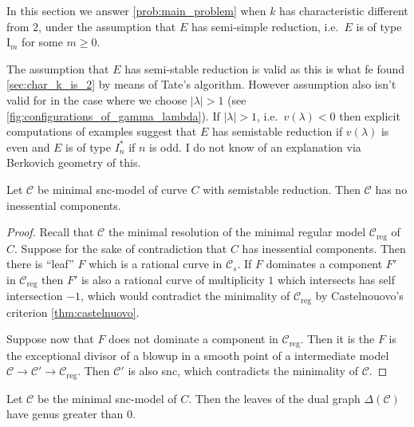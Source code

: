 In this section we answer \cref{prob:main_problem} when $k$ has characteristic different from $2$, under the assumption that $E$ has semi-simple reduction, i.e.\  $E$ is of type $\mathrm I_m$ for some $m \ge 0$. 

\begin{remark}
	The assumption that $E$ has semi-stable reduction is valid as this is what fe found \cref{sec:char_k_is_2} by means of Tate's algorithm. 
	However assumption also isn't valid for in the case where we choose $|\lambda| > 1$ (see \cref{fig:configurations_of_gamma_lambda}).
	If $|\lambda| > 1$, i.e.\ $v(\lambda) < 0$ then
	explicit computations of examples suggest that  $E$ has semistable reduction if $v(\lambda)$ is even and $E$ is of type $I^*_n$ if $n$ is odd. 
	I do not know of an explanation via Berkovich geometry of this. 
\end{remark}

\begin{lemma}\label{lem:semistable_skeleton}
	Let $\mathscr C$ be minimal snc-model of curve $C$ with semistable reduction.
	Then $\mathscr C$ has no inessential components. 
\end{lemma}
\begin{proof}
	Recall that $\mathscr C$ the minimal resolution of the minimal regular model $\mathscr C_\text{reg} $ of $C$. 
	Suppose for the sake of contradiction that  $C$ has inessential components.
	Then there is ``leaf''  $F$ which is a rational curve in $\mathscr C_s$. 
	If $F$ dominates a component $F'$ in $\mathscr C_\text{reg} $ then $F'$ is also a rational curve of multiplicity $1$ which intersects has self intersection $-1$,  which would contradict the minimality of  $\mathscr C _\text{reg} $ by Castelnouovo's criterion \cref{thm:castelnuovo}. 

	Suppose now that $F$ does not dominate a component in $\mathscr C_\text{reg} $.
	Then it is the $F$ is the exceptional divisor of a blowup in a smooth point of a intermediate model $\mathscr C \to \mathscr C' \to \mathscr C_\text{reg} $. 
	Then $\mathscr C'$ is also snc, which contradicts the minimality of $\mathscr C$. 
\end{proof}
\begin{corollary}
	Let $\mathscr C$ be the minimal snc-model of $C$. 
	Then the leaves of the dual graph  $\Delta (\mathscr C)$ have genus greater than $0$. 
\end{corollary}

